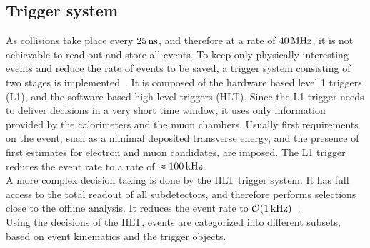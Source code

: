 \subsection{Trigger system}
As collisions take place every $25\,\text{ns}$, and therefore at a rate of $40\,\text{MHz}$, it is not achievable to read out and store all events. To keep only physically interesting events and reduce the rate of events to be saved, a trigger system consisting of two stages is implemented~\cite{TriggerSystem}. It is composed of the hardware based level 1 triggers (L1), and the software based high level triggers (HLT). Since the L1 trigger needs to deliver decisions in a very short time window, it uses only information provided by the calorimeters and the muon chambers. Usually first requirements on the event, such as a minimal deposited transverse energy, and  the presence of first estimates for electron and muon candidates, are imposed. The L1 trigger reduces the event rate to a rate of $\approx100\,\text{kHz}$.\\
A more complex decision taking is done by the HLT trigger system. It has full access to the total readout of all subdetectors, and therefore performs selections close to the offline analysis. It reduces the event rate to $\mathcal{O}(1\,\text{kHz})$~\cite{TriggerRate}.\\
Using the decisions of the HLT, events are categorized into different subsets, based on event kinematics and the trigger objects.
